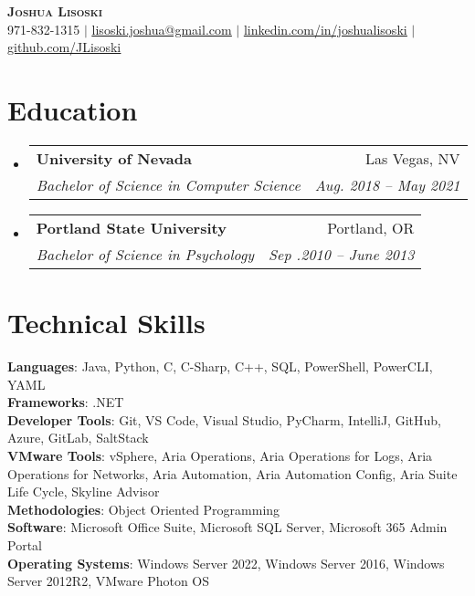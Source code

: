 \documentclass[letterpaper,11pt]{article}
\makeatletter
\newcommand{\resumeSubheading}[4]{
  \vspace{-2pt}\item
    \begin{tabular*}{0.97\textwidth}[t]{l@{\extracolsep{\fill}}r}
      \textbf{#1} & #2 \\
      \textit{\small#3} & \textit{\small #4} \\
    \end{tabular*}\vspace{-7pt}
}
\newcommand{\resumeSubHeadingListStart}{\begin{itemize}[leftmargin=0.15in, label={}]}
\newcommand{\resumeSubHeadingListEnd}{\end{itemize}}
\makeatother
\begin{document}

\begin{center}
    \textbf{\Huge \scshape Joshua Lisoski} \\ \vspace{1pt}
    \small 971-832-1315 $|$ \href{mailto:x@x.com}{\underline{lisoski.joshua@gmail.com}} $|$ 
    \href{https://linkedin.com/in/...}{\underline{linkedin.com/in/joshualisoski}} $|$
    \href{https://github.com/...}{\underline{github.com/JLisoski}}
\end{center}


\section{Education}
  \resumeSubHeadingListStart
    \resumeSubheading
      {University of Nevada}{Las Vegas, NV}
      {Bachelor of Science in Computer Science}{Aug. 2018 -- May 2021}
    \resumeSubheading
      {Portland State University}{Portland, OR}
      {Bachelor of Science in Psychology}{Sep .2010 -- June 2013}
  \resumeSubHeadingListEnd

\section{Technical Skills}
 \begin{itemize}[leftmargin=0.15in, label={}]
    \small{\item{
     \textbf{Languages}{: Java, Python, C, C-Sharp, C++, SQL, PowerShell, PowerCLI, YAML} \\
     \textbf{Frameworks}{: .NET} \\
     \textbf{Developer Tools}{: Git, VS Code, Visual Studio, PyCharm, IntelliJ, GitHub, Azure, GitLab, SaltStack} \\
     \textbf{VMware Tools}{: vSphere, Aria Operations, Aria Operations for Logs, Aria Operations for Networks, Aria Automation, Aria Automation Config, Aria Suite Life Cycle, Skyline Advisor}\\
     \textbf{Methodologies}{: Object Oriented Programming} \\
     \textbf{Software}{: Microsoft Office Suite, Microsoft SQL Server, Microsoft 365 Admin Portal}\\
     \textbf{Operating Systems}{: Windows Server 2022, Windows Server 2016, Windows Server 2012R2, VMware Photon OS}
    }}
 \end{itemize}
 
\end{document}

